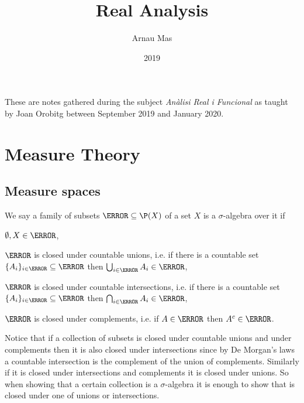 \documentclass[12pt,oneside]{book}
\title{Real Analysis}
\author{Arnau Mas}
\date{2019}
\begin{document}
\maketitle

\frontmatter
\pagestyle{plain}
These are notes gathered during the subject \emph{Anàlisi Real i Funcional} as taught by Joan Orobitg between September 2019 and January 2020.

\mainmatter

\part{Measure Theory}
\chapter{Measure spaces}
\begin{definition}
	We say a family of subsets \( \A \subseteq \P(X) \) of a set \( X \) is a \( \sigma \)-algebra over it if
	\begin{points}
	\item \( \emptyset, X \in \A \),
	\item \( \A \) is closed under countable unions, i.e. if there is a countable set \( \{ A_i \}_{i \in \N} \subseteq \A \) then \( \bigcup_{i \in \N} A_i \in \A \),
	\item \( \A \) is closed under countable intersections, i.e. if there is a countable set \( \{ A_i \}_{i \in \N} \subseteq \A \) then \( \bigcap_{i \in \N} A_i \in \A \),
	\item \( \A \) is closed under complements, i.e. if \( A \in \A \) then \( A^c \in \A \).
	\end{points}
\end{definition}
Notice that if a collection of subsets is closed under countable unions and under complements then it is also closed under intersections since by De Morgan's laws a countable intersection is the complement of the union of complements. Similarly if it is closed under intersections and complements it is closed under unions. So when showing that a certain collection is a \( \sigma \)-algebra it is enough to show that is closed under one of unions or intersections.
\end{document}
